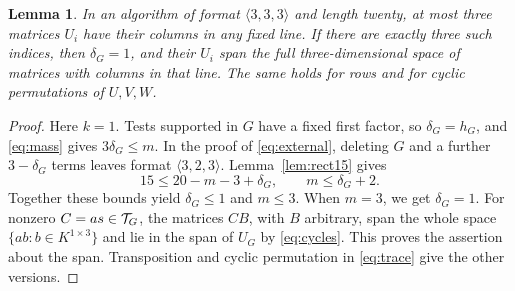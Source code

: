 \documentclass[11pt,a4paper]{article}
\numberwithin{equation}{section}
\theoremstyle{plain}
\newtheorem{lemma}[theorem]{Lemma}
\theoremstyle{definition}
\newcommand{\leqs}{\leqslant}\newcommand{\geqs}{\geqslant}
\begin{document}
\begin{lemma}\label{lem:point-capacity}
In an algorithm of format $\langle3,3,3\rangle$ and length twenty,
at most three matrices $U_i$ have their columns in any fixed line.
If there are exactly three such indices, then $\delta_G=1$, and their
$U_i$ span the full three-dimensional space of matrices with columns
in that line. The same holds for rows and for cyclic permutations
of $U,V,W$.
\end{lemma}
\begin{proof}
Here $k=1$. Tests supported in $G$ have a fixed first factor, so
$\delta_G=h_G$, and \eqref{eq:mass} gives $3\delta_G\leqs m$.
In the proof of \eqref{eq:external}, deleting $G$ and a further
$3-\delta_G$ terms leaves format $\langle3,2,3\rangle$.
Lemma~\ref{lem:rect15} gives
\[
 15\leqs20-m-3+\delta_G,\qquad m\leqs\delta_G+2.
\]
Together these bounds yield $\delta_G\leqs1$ and $m\leqs3$.
When $m=3$, we get $\delta_G=1$.
For nonzero $C=as\in\mathcal T_G$, the matrices $CB$, with $B$ arbitrary,
span the whole space $\{ab:b\in K^{1\times3}\}$ and lie in the span
of $U_G$ by \eqref{eq:cycles}. This proves the assertion about the span.
Transposition and cyclic permutation in \eqref{eq:trace} give the
other versions.
\end{proof}
\end{document}
